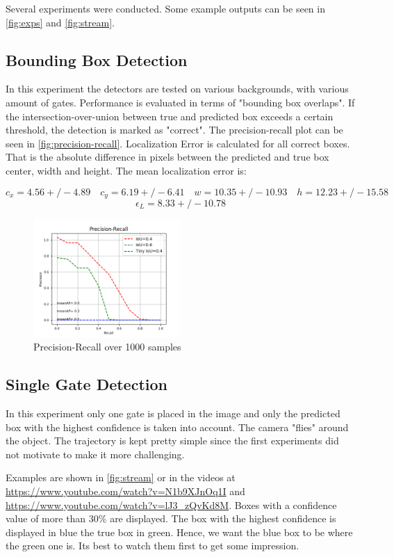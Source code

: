\documentclass{article}
\begin{document}
Several experiments were conducted. Some example outputs can be seen in \autoref{fig:exps} and \autoref{fig:stream}. 

\subsection{Bounding Box Detection} 
In this experiment the detectors are tested on various backgrounds, with various amount of gates. Performance is evaluated in terms of "bounding box overlaps". If the intersection-over-union between true and predicted box exceeds a certain threshold, the detection is marked as "correct". The precision-recall plot can be seen in \autoref{fig:precision-recall}. Localization Error is calculated for all correct boxes. That is the absolute difference in pixels between the predicted and true box center, width and height. The mean localization error is:

$$c_x = 4.56 +/- 4.89 \quad c_y = 6.19 +/- 6.41 \quad w = 10.35 +/- 10.93 \quad h = 12.23 +/- 15.58$$
$$\epsilon_L = 8.33 +/- 10.78$$
\begin{figure}[h!]
	\centering
	\includegraphics[width=0.5\textwidth]{../fig/precision-recall}
	\caption{Precision-Recall over 1000 samples}
	\label{fig:precision-recall}
\end{figure}

\subsection{Single Gate Detection} 
In this experiment only one gate is placed in the image and only the predicted box with the highest confidence is taken into account. The camera "flies" around the object. The trajectory is kept pretty simple since the first experiments did not motivate to make it more challenging.

Examples are shown in \autoref{fig:stream} or in the videos at \url{https://www.youtube.com/watch?v=N1b9XJnOq1I} and \url{https://www.youtube.com/watch?v=lJ3_zQvKd8M}. Boxes with a confidence value of more than 30\% are displayed. The box with the highest confidence is displayed in blue the true box in green. Hence, we want the blue box to be where the green one is. Its best to watch them first to get some impression.
\end{document}
